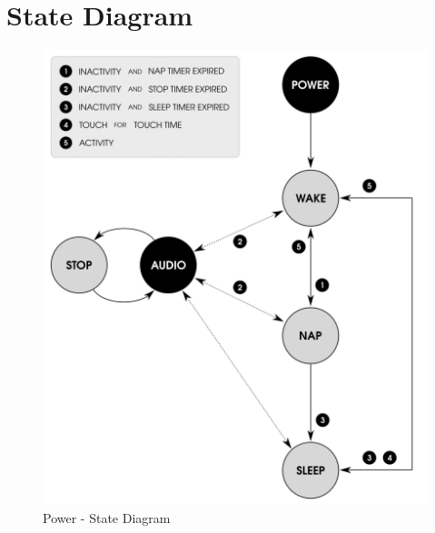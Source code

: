 \section{State Diagram}

\begin{figure}[H]
\centering
  \includegraphics{images/power_state_diagram.png}
\caption{Power - State Diagram}
\end{figure}
